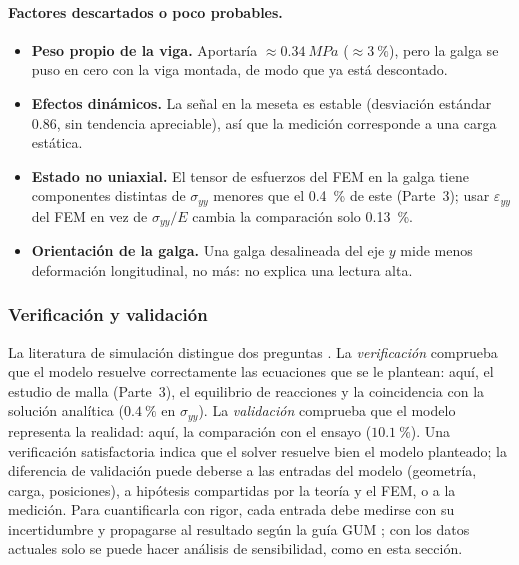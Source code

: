 \documentclass[11pt,a4paper]{article}
\begin{document}
\paragraph{Factores descartados o poco probables.}
\begin{itemize}
\item \textbf{Peso propio de la viga.} Aportar\'ia $\approx\SI{0,34}{MPa}$ ($\approx\SI{3}{\percent}$), pero la galga se puso en cero con la viga montada, de modo que ya est\'a descontado.
\item \textbf{Efectos din\'amicos.} La se\~nal en la meseta es estable (desviaci\'on est\'andar \SI{0,86}{\microstrain}, sin tendencia apreciable), as\'i que la medici\'on corresponde a una carga est\'atica.
\item \textbf{Estado no uniaxial.} El tensor de esfuerzos del FEM en la galga tiene componentes distintas de $\sigma_{yy}$ menores que el \SI{0,4}{\percent} de este (Parte~3); usar $\varepsilon_{yy}$ del FEM en vez de $\sigma_{yy}/E$ cambia la comparaci\'on solo \SI{0,13}{\percent}.
\item \textbf{Orientaci\'on de la galga.} Una galga desalineada del eje $y$ mide menos deformaci\'on longitudinal, no m\'as: no explica una lectura alta.
\end{itemize}

\subsubsection{Verificaci\'on y validaci\'on}
La literatura de simulaci\'on distingue dos preguntas \cite{asme,oberkampf}. La \emph{verificaci\'on} comprueba que el modelo resuelve correctamente las ecuaciones que se le plantean: aqu\'i, el estudio de malla (Parte~3), el equilibrio de reacciones y la coincidencia con la soluci\'on anal\'itica ($\SI{+0,4}{\percent}$ en $\sigma_{yy}$). La \emph{validaci\'on} comprueba que el modelo representa la realidad: aqu\'i, la comparaci\'on con el ensayo ($\SI{+10,1}{\percent}$). Una verificaci\'on satisfactoria indica que el solver resuelve bien el modelo planteado; la diferencia de validaci\'on puede deberse a las entradas del modelo (geometr\'ia, carga, posiciones), a hip\'otesis compartidas por la teor\'ia y el FEM, o a la medici\'on. Para cuantificarla con rigor, cada entrada debe medirse con su incertidumbre y propagarse al resultado seg\'un la gu\'ia GUM \cite{gum}; con los datos actuales solo se puede hacer an\'alisis de sensibilidad, como en esta secci\'on.
\end{document}
